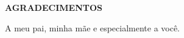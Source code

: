 \begin{center}
\textbf{AGRADECIMENTOS} \\ [2.5cm]
\end{center}

A meu pai, minha mãe e especialmente a você.

